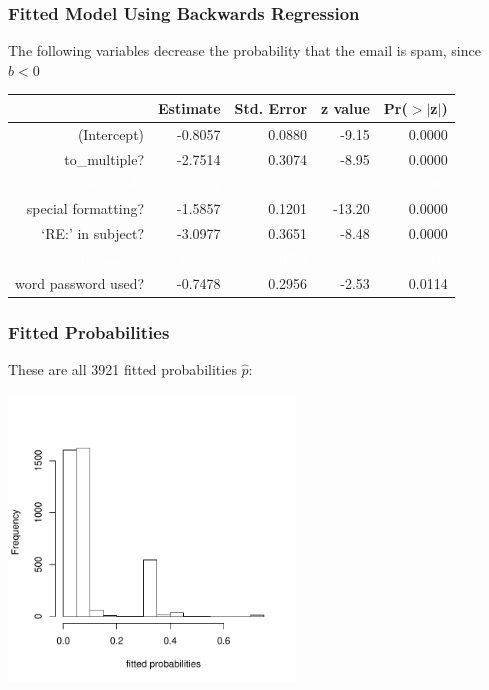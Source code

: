 \documentclass[slides]{beamer}
\newcommand{\blue}[1]{\textcolor{blue2}{#1}}
\newcommand{\white}[1]{\textcolor{white}{#1}}
\begin{document}
\begin{frame}[fragile]
\frametitle{Fitted Model Using Backwards Regression}
The following variables decrease the probability that the email is spam, since $b<0$

\begin{table}[ht]
\centering
\begin{tabular}{r|rrrr}
  \hline
 & Estimate & Std. Error & z value & Pr($>$$|$z$|$) \\ 
  \hline
(Intercept) & -0.8057 & 0.0880 & -9.15 & 0.0000 \\ 
  \blue{to\_multiple?} & \blue{-2.7514} & \blue{0.3074} & \blue{-8.95} & \blue{0.0000} \\ 
  \white{word winner used?} & \white{1.7251} & \white{0.3245} & \white{5.32} & \white{0.0000} \\ 
  \blue{special formatting?} & \blue{-1.5857} & \blue{0.1201} & \blue{-13.20} & \blue{0.0000} \\ 
  \blue{`RE:' in subject?} & \blue{-3.0977} & \blue{0.3651} & \blue{-8.48} & \blue{0.0000} \\ 
  \white{attachment?} & \white{0.2127} & \white{0.0572} & \white{3.72} & \white{0.0002} \\ 
  \blue{word password used?} & \blue{-0.7478} & \blue{0.2956} & \blue{-2.53} & \blue{0.0114} \\ 
   \hline
\end{tabular}
\end{table} 

\end{frame}


\begin{frame}[fragile]
\frametitle{Fitted Probabilities}
These are all 3921 fitted probabilities $\widehat{p}$:
\begin{center}
\includegraphics[width=3in]{figure/fitted.pdf}
\end{center}

\end{frame}
\end{document}
